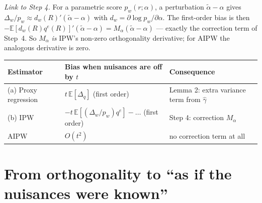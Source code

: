 \documentclass[11pt,a4paper]{article}
\theoremstyle{remark}
\newcommand{\E}{\mathbb{E}}
\newcommand{\1}{\mathbf{1}}
\newcommand{\qe}{q^{e}}
\begin{document}
\emph{Link to Step 4.} For a parametric score $p_w(r;\alpha)$, a perturbation $\tilde\alpha-\alpha$ gives $\Delta_w/p_w\approx d_w(R)'(\tilde\alpha-\alpha)$ with $d_w=\partial\log p_w/\partial\alpha$. The first-order bias is then $-\E[d_w(R)\qe(R)]'(\tilde\alpha-\alpha)=M_\alpha(\tilde\alpha-\alpha)$ --- exactly the correction term of Step~4. So $M_\alpha$ \emph{is} IPW's non-zero orthogonality derivative; for AIPW the analogous derivative is zero.

\begin{resultbox}[Summary of \S2]
\centering
\small
\begin{tabular}{@{}p{3.1cm}p{5.6cm}p{5.6cm}@{}}
\toprule
Estimator & Bias when nuisances are off by $t$ & Consequence \\
\midrule
(a) Proxy regression & $t\,\E[\Delta_q]$ (first order) & Lemma 2: extra variance term from $\hat\gamma$\\
(b) IPW & $-t\,\E[(\Delta_w/p_w)\qe]-\dots$ (first order) & Step 4: correction $M_\alpha$\\
AIPW & $O(t^2)$ & no correction term at all\\
\bottomrule
\end{tabular}
\end{resultbox}

\section{From orthogonality to ``as if the nuisances were known''}
\end{document}
